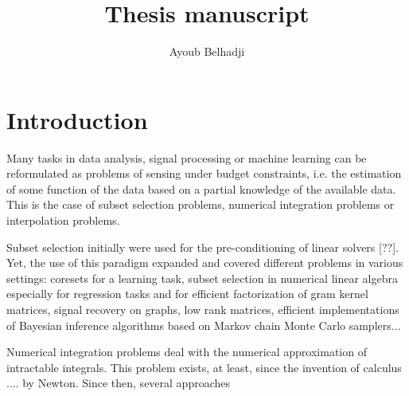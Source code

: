 \documentclass[twoside,11pt]{book}
\numberwithin{theorem}{chapter}
\numberwithin{definition}{chapter}
\numberwithin{proposition}{chapter}
\numberwithin{corollary}{chapter}
\numberwithin{example}{chapter}
\numberwithin{lemma}{chapter}
\begin{document}
\title{Thesis manuscript}


\author{Ayoub Belhadji} %
 
\maketitle






\newpage
\chapter{Introduction}\label{chap:introduction}
Many tasks in data analysis, signal processing or machine learning can be reformulated as problems of sensing under budget constraints, i.e. the estimation of some function of the data based on a partial knowledge of the available data. This is the case of subset selection problems, numerical integration problems or interpolation problems. 

Subset selection initially were used for the pre-conditioning of linear solvers [??]. Yet, the use of this paradigm expanded and covered different problems in various settings: coresets for a learning task, subset selection in numerical linear algebra especially for regression tasks and for efficient factorization of gram kernel matrices, signal recovery on graphs, low rank matrices, efficient implementations of Bayesian inference algorithms based on Markov chain Monte Carlo samplers...

Numerical integration problems deal with the numerical approximation of intractable integrals. This problem exists, at least, since the invention of calculus .... by Newton. Since then, several approaches
\end{document}

